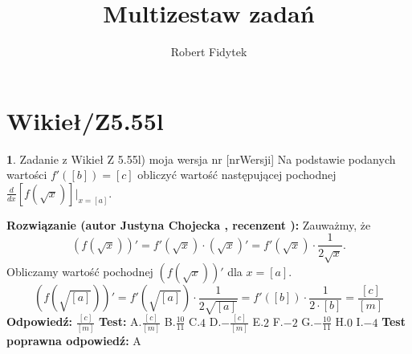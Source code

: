 \documentclass[12pt, a4paper]{article}
\title{Multizestaw zadań}
\author{Robert Fidytek}
\date{}
\theoremstyle{definition} %
\newtheorem{zad}{}
\newcommand{\kategoria}[1]{\section{#1}} %
\newcommand{\zadStart}[1]{\begin{zad}#1\newline} %
\newcommand{\zadStop}{\end{zad}}   %
\newcommand{\rozwStart}[2]{\noindent \textbf{Rozwiązanie (autor #1 , recenzent #2): }\newline} %
\newcommand{\rozwStop}{\newline}                                            %
\newcommand{\odpStart}{\noindent \textbf{Odpowiedź:}\newline}    %
\newcommand{\odpStop}{\newline}                                             %
\newcommand{\testStart}{\noindent \textbf{Test:}\newline} %
\newcommand{\testStop}{\newline} %
\newcommand{\kluczStart}{\noindent \textbf{Test poprawna odpowiedź:}\newline} %
\newcommand{\kluczStop}{\newline} %
\begin{document}
\maketitle


\kategoria{Wikieł/Z5.55l}
\zadStart{Zadanie z Wikieł Z 5.55l) moja wersja nr [nrWersji]}
Na podstawie podanych wartości $f'([b])=[c]$ obliczyć wartość następującej pochodnej $\frac{d}{dx}\left[f(\sqrt{x})\right] \big |_{x=[a]}$.
\zadStop
\rozwStart{Justyna Chojecka}{}
Zauważmy, że 
$$(f(\sqrt{x}))'=f'(\sqrt{x})\cdot (\sqrt{x})'=f'(\sqrt{x})\cdot \frac{1}{2\sqrt{x}}.$$
Obliczamy wartość pochodnej $(f(\sqrt{x}))'$ dla $x=[a]$.
$$\left(f\left(\sqrt{[a]}\right)\right)'=f'\left(\sqrt{[a]}\right)\cdot \frac{1}{2\sqrt{[a]}}=f'([b])\cdot \frac{1}{2\cdot [b]}=\frac{[c]}{[m]}$$
\rozwStop
\odpStart
$\frac{[c]}{[m]}$
\odpStop
\testStart
A.$\frac{[c]}{[m]}$
B.$\frac{10}{11}$
C.$4$
D.$-\frac{[c]}{[m]}$
E.$2$
F.$-2$
G.$-\frac{10}{11}$
H.$0$
I.$-4$
\testStop
\kluczStart
A
\kluczStop
\end{document}
